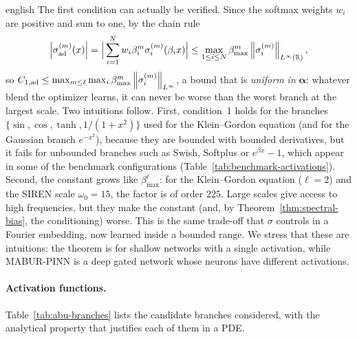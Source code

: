 \documentclass[../0000.tex]{subfiles}
\begin{document}
\begin{hyphenrules}{english}
The first condition can actually be verified. Since the softmax weights $w_i$ are positive and sum to one,
by the chain rule
\begin{equation}
  \left\lvert \sigma^{(m)}_{\mathrm{ad}}(x) \right\rvert=\Big|\sum_{i=1}^{N}w_i\beta_i^{m}\sigma_i^{(m)}(\beta_ix)\Big|
  \le\max_{1\le i\le N}\beta_{\max}^{m}\left\lVert \sigma_i^{(m)} \right\rVert_{L^\infty(\mathbb{R})},
  \label{eq:abu-bound}
\end{equation}
so $C_{1,\mathrm{ad}}\le\max_{m\le\ell}\max_i\beta_{\max}^{m}\left\lVert \sigma_i^{(m)} \right\rVert_{L^\infty}$, a bound that is
\emph{uniform in} $\bm\alpha$: whatever blend the optimizer learns, it can never be worse than the worst
branch at the largest scale. Two intuitions follow. First, condition~1 holds for the branches
$\{\sin,\cos,\tanh,1/(1+x^2)\}$ used for the Klein--Gordon equation (and for the Gaussian branch
$e^{-x^2}$), because they are bounded with bounded derivatives, but it fails for unbounded branches such as
Swish, Softplus or $e^{\beta x}-1$, which appear in some of the benchmark configurations
(Table~\ref{tab:benchmark-activations}). Second, the constant grows like $\beta_{\max}^{\ell}$: for the
Klein--Gordon equation ($\ell=2$) and the SIREN scale $\omega_0=15$, the factor is of order $225$. Large
scales give access to high frequencies, but they make the constant (and, by Theorem~\ref{thm:spectral-bias}, the
conditioning) worse. This is the same trade-off that $\sigma$ controls in a Fourier embedding, now learned
inside a bounded range. We stress that these are intuitions: the theorem is for shallow networks with a
single activation, while MABUR-PINN is a deep gated network whose neurons have different activations.

\paragraph{Activation functions.}
Table~\ref{tab:abu-branches} lists the candidate branches considered, with the analytical property that
justifies each of them in a PDE.


\end{hyphenrules}
\end{document}
